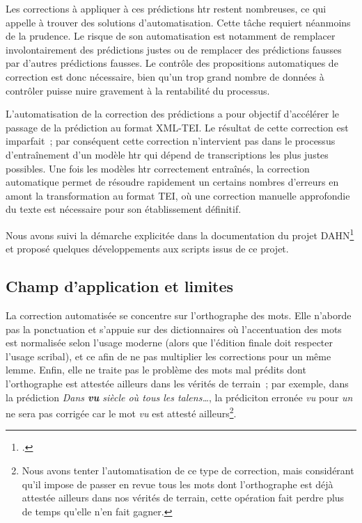 \documentclass[a4paper,12pt,twoside]{book}
\begin{document}
			Les corrections à appliquer à ces prédictions \gls{htr} restent nombreuses, ce qui appelle à trouver des solutions d'automatisation. Cette tâche requiert néanmoins de la prudence. Le risque de son automatisation est notamment de remplacer involontairement des prédictions justes ou de remplacer des prédictions fausses par d'autres prédictions fausses. Le contrôle des propositions automatiques de correction est donc nécessaire, bien qu'un trop grand nombre de données à contrôler puisse nuire gravement à la rentabilité du processus.
			
			L'automatisation de la correction des prédictions a pour objectif d'accélérer le passage de la prédiction au format XML-TEI. Le résultat de cette correction est imparfait~; par conséquent cette correction n'intervient pas dans le processus d'entraînement d'un modèle \gls{htr} qui dépend de transcriptions les plus justes possibles. Une fois les modèles \gls{htr} correctement entraînés, la correction automatique permet de résoudre rapidement un certains nombres d'erreurs en amont la transformation au format TEI, où une correction manuelle approfondie du texte est nécessaire pour son établissement définitif.
			
			Nous avons suivi la démarche explicitée dans la documentation du projet DAHN\footcite{chiffoleauHowPostOCRCorrection2022} et proposé quelques développements aux scripts issus de ce projet.
			
			\subsection{Champ d'application et limites}	
				La correction automatisée se concentre sur l'orthographe des mots. Elle n'aborde pas la ponctuation et s'appuie sur des dictionnaires où l'accentuation des mots est normalisée selon l'usage moderne (alors que l'édition finale doit respecter l'usage scribal), et ce afin de ne pas multiplier les corrections pour un même lemme. Enfin, elle ne traite pas le problème des mots mal prédits dont l'orthographe est attestée ailleurs dans les vérités de terrain~; par exemple, dans la prédiction \textit{Dans \textbf{vu} siècle où tous les talens…}, la prédiciton erronée \textit{vu} pour \textit{un} ne sera pas corrigée car le mot \textit{vu} est attesté ailleurs\footnote{Nous avons tenter l'automatisation de ce type de correction, mais considérant qu'il impose de passer en revue tous les mots dont l'orthographe est déjà attestée ailleurs dans nos vérités de terrain, cette opération fait perdre plus de temps qu'elle n'en fait gagner.}.
					
\end{document}
